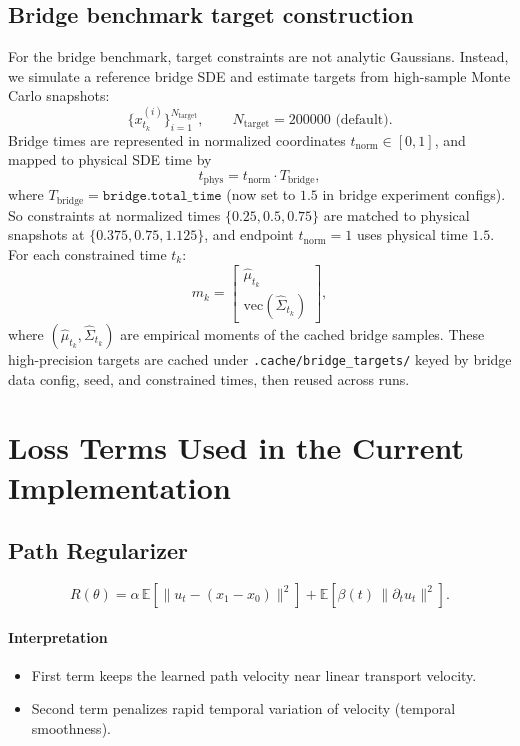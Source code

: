 \documentclass[11pt]{article}
\begin{document}
\subsection{Bridge benchmark target construction}
For the bridge benchmark, target constraints are not analytic Gaussians.
Instead, we simulate a reference bridge SDE and estimate targets from high-sample Monte Carlo snapshots:
\[
\{x_{t_k}^{(i)}\}_{i=1}^{N_{\text{target}}},\qquad N_{\text{target}}=200000 \text{ (default)}.
\]
Bridge times are represented in normalized coordinates $t_{\mathrm{norm}}\in[0,1]$, and mapped to physical SDE time by
\[
t_{\mathrm{phys}} = t_{\mathrm{norm}} \cdot T_{\mathrm{bridge}},
\]
where $T_{\mathrm{bridge}}=\texttt{bridge.total\_time}$ (now set to $1.5$ in bridge experiment configs).
So constraints at normalized times $\{0.25,0.5,0.75\}$ are matched to physical snapshots at $\{0.375,0.75,1.125\}$, and endpoint $t_{\mathrm{norm}}=1$ uses physical time $1.5$.
For each constrained time $t_k$:
\[
m_k
=
\begin{bmatrix}
\hat{\mu}_{t_k}\\
\mathrm{vec}(\hat{\Sigma}_{t_k})
\end{bmatrix},
\]
where $(\hat{\mu}_{t_k},\hat{\Sigma}_{t_k})$ are empirical moments of the cached bridge samples.
These high-precision targets are cached under \texttt{.cache/bridge\_targets/} keyed by bridge data config, seed, and constrained times, then reused across runs.

\section{Loss Terms Used in the Current Implementation}
\subsection{Path Regularizer}
\[
R(\theta)
=
\alpha\,
\mathbb{E}\!\left[\|u_t-(x_1-x_0)\|^2\right]
+\mathbb{E}\!\left[\beta(t)\,\|\partial_t u_t\|^2\right].
\]

\paragraph{Interpretation}
\begin{itemize}
    \item First term keeps the learned path velocity near linear transport velocity.
    \item Second term penalizes rapid temporal variation of velocity (temporal smoothness).
\end{itemize}
\end{document}
